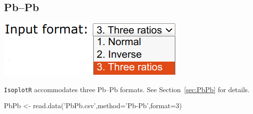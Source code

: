 \begin{refsection}

\chapter{Pb--Pb}
\label{ch:PbPb-R}

\noindent\begin{minipage}[t]{.3\linewidth}
\strut\vspace*{-\baselineskip}\newline
\includegraphics[width=\linewidth]{../figures/PbPbFormats.png}
\end{minipage}
\begin{minipage}[t]{.7\textwidth}
  \texttt{IsoplotR} accommodates three Pb--Pb formats. See
  Section~\ref{sec:PbPb} for details.
\end{minipage}

\begin{console}
PbPb <- read.data('PbPb.csv',method='Pb-Pb',format=3)
\end{console}


\end{refsection}
